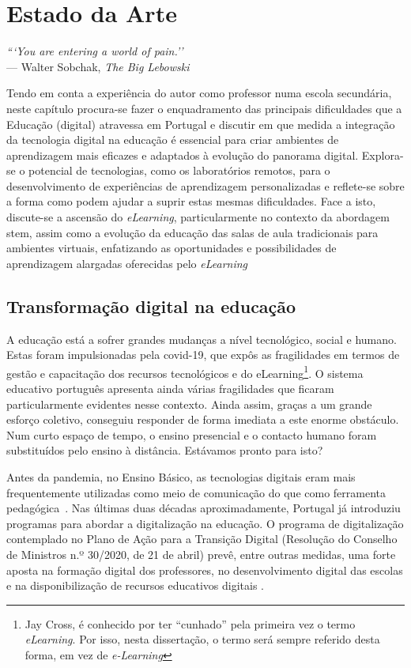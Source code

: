 \chapter{Estado da Arte}
\label{Capitulo2}

\begin{flushright}
\textit{```You are entering a world of pain.''} \\[0.5em]
--- Walter Sobchak, \textit{The Big Lebowski}
\end{flushright}
Tendo em conta a experiência do autor como professor numa escola secundária, neste capítulo procura-se fazer o enquadramento das principais dificuldades que a Educação (digital) atravessa em Portugal e discutir em que medida a integração da tecnologia digital na educação é essencial para criar ambientes de aprendizagem mais eficazes e adaptados à evolução do panorama digital. Explora-se o potencial de tecnologias, como os laboratórios remotos, para o desenvolvimento de experiências de aprendizagem personalizadas e reflete-se sobre a forma como podem ajudar a suprir estas mesmas dificuldades.
Face a isto, discute-se a ascensão do \textit{eLearning}, particularmente no contexto da abordagem \acrshort{stem}, assim como a evolução da educação das salas de aula tradicionais para ambientes virtuais, enfatizando as oportunidades e possibilidades de aprendizagem alargadas oferecidas pelo \textit{eLearning}

\section{Transformação digital na educação}
\label{sec:transformaçãodigital}
A educação está a sofrer grandes mudanças a nível tecnológico, social e humano. Estas foram impulsionadas pela \acrfull{covid-19}, que expôs as fragilidades em termos de gestão e capacitação dos recursos tecnológicos e do eLearning\footnote{Jay Cross, é conhecido por ter ``cunhado'' pela primeira vez o termo \textit{eLearning}\cite{jaycross}. Por isso, nesta dissertação, o termo será sempre referido desta forma, em vez de \textit{e-Learning}}. O sistema educativo português apresenta ainda várias fragilidades que ficaram particularmente evidentes nesse contexto. Ainda assim, graças a um grande esforço coletivo, conseguiu responder de forma imediata a este enorme obstáculo. Num curto espaço de tempo, o ensino presencial e o contacto humano foram substituídos pelo ensino à distância. Estávamos pronto para isto?

Antes da pandemia, no Ensino Básico, as tecnologias digitais eram mais frequentemente utilizadas como meio de comunicação do que como ferramenta pedagógica~\cite{oecd_using_2021}. Nas últimas duas décadas aproximadamente, Portugal já introduziu programas para abordar a digitalização na educação. O programa de digitalização contemplado no Plano de Ação para a Transição Digital (Resolução do Conselho de Ministros n.º 30/2020, de 21 de abril) prevê, entre outras medidas, uma forte aposta na formação digital dos professores, no desenvolvimento digital das escolas e na disponibilização de recursos educativos digitais \cite{transicaodigital, capacitacaodigital}.

